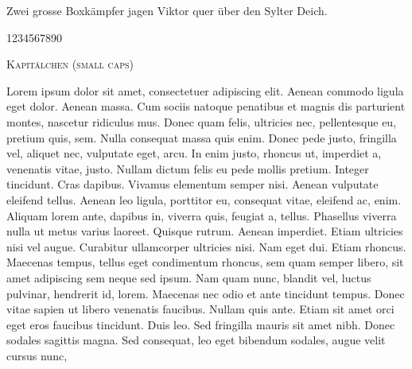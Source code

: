 \documentclass[12pt,a4paper]{scrartcl}
\begin{document}
Zwei grosse Boxkämpfer jagen Viktor quer über den Sylter Deich.

1234567890

\textsc{Kapitälchen (small caps)}

Lorem ipsum dolor sit amet, consectetuer adipiscing elit. Aenean commodo ligula eget dolor. Aenean massa. Cum sociis natoque penatibus et magnis dis parturient montes, nascetur ridiculus mus. Donec quam felis, ultricies nec, pellentesque eu, pretium quis, sem. Nulla consequat massa quis enim. Donec pede justo, fringilla vel, aliquet nec, vulputate eget, arcu. In enim justo, rhoncus ut, imperdiet a, venenatis vitae, justo. Nullam dictum felis eu pede mollis pretium. Integer tincidunt. Cras dapibus. Vivamus elementum semper nisi. Aenean vulputate eleifend tellus. Aenean leo ligula, porttitor eu, consequat vitae, eleifend ac, enim. Aliquam lorem ante, dapibus in, viverra quis, feugiat a, tellus. Phasellus viverra nulla ut metus varius laoreet. Quisque rutrum. Aenean imperdiet. Etiam ultricies nisi vel augue. Curabitur ullamcorper ultricies nisi. Nam eget dui. Etiam rhoncus. Maecenas tempus, tellus eget condimentum rhoncus, sem quam semper libero, sit amet adipiscing sem neque sed ipsum. Nam quam nunc, blandit vel, luctus pulvinar, hendrerit id, lorem. Maecenas nec odio et ante tincidunt tempus. Donec vitae sapien ut libero venenatis faucibus. Nullam quis ante. Etiam sit amet orci eget eros faucibus tincidunt. Duis leo. Sed fringilla mauris sit amet nibh. Donec sodales sagittis magna. Sed consequat, leo eget bibendum sodales, augue velit cursus nunc,
\end{document}
